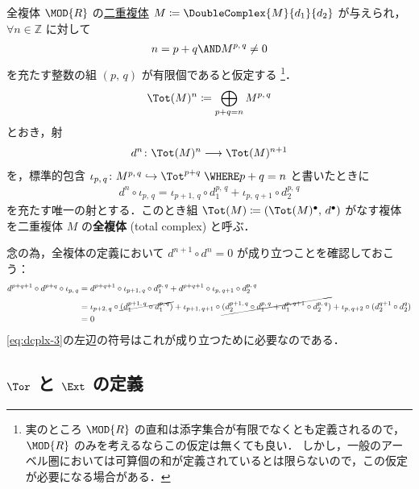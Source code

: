 \documentclass[algtopo_main]{subfiles}
\begin{document}
\begin{mydef}[label=def:Tot]{全複体}
    $\MOD{R}$ の\hyperref[def:double-complex]{二重複体} $M \coloneqq \DoubleComplex{M}{d_1}{d_2}$ が与えられ，$\forall n \in \mathbb{Z}$ に対して
    \begin{align}
        n = p+q \AND M^{p,\, q} \neq 0
    \end{align}
    を充たす整数の組 $(p,\, q)$ が有限個であると仮定する
    \footnote{実のところ $\MOD{R}$ の直和は添字集合が有限でなくとも定義されるので，$\MOD{R}$ のみを考えるならこの仮定は無くても良い．
        しかし，一般のアーベル圏においては可算個の和が定義されているとは限らないので，この仮定が必要になる場合がある．
    }．
    \begin{align}
        \Tot(M)^n \coloneqq \bigoplus_{p+q = n} M^{p,\, q}
    \end{align}
    とおき，射
    \begin{align}
        d^n \colon \Tot(M)^n \lto \Tot(M)^{n+1}
    \end{align}
    を，標準的包含 $\iota_{p,\, q} \colon M^{p,\, q} \hookrightarrow \Tot^{p+q}\; \WHERE p+q = n$ と書いたときに
    \begin{align}
        d^n \circ \iota_{p,\, q} = \iota_{p+1,\, q} \circ d_1^{p,\, q} + \iota_{p,\, q+1} \circ d_2^{p,\, q}
    \end{align}
    を充たす唯一の射とする．このとき組 $\Tot(M) \coloneqq (\Tot(M)^\bullet,\, d^\bullet)$ がなす複体を二重複体 $M$ の\textbf{全複体} (total complex) と呼ぶ．
\end{mydef}
念の為，全複体の定義において $d^{n+1} \circ d^n = 0$ が成り立つことを確認しておこう：
\begin{align}
    d^{p+q+1} \circ d^{p+q} \circ \iota_{p,\, q}
    &= d^{p+q+1} \circ \iota_{p+1,\, q} \circ d_1^{p,\, q} + d^{p+q+1} \circ \iota_{p,\, q+1} \circ d_2^{p,\, q} \\
    &= \iota_{p+2,\, q} \circ \cancel{(d_1^{p+1,\, q} \circ d_1^{p,\, q})} + \iota_{p+1,\, q+1} \circ \cancel{(d_2^{p+1,\, q} \circ d_1^{p,\, q} + d_1^{p,\, q+1} \circ d_2^{p,\, q})} + \iota_{p,\, q+2} \circ (d_2^{q+1} \circ d_2^{q}) \\
    &=0
\end{align}
\eqref{eq:dcplx-3}の左辺の符号はこれが成り立つために必要なのである．


\subsection{$\Tor$ と $\Ext$ の定義}
\end{document}
